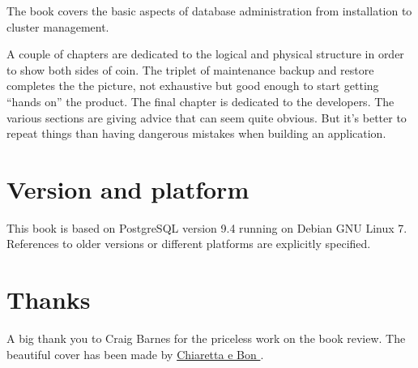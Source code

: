 \documentclass[oneside]{book}
\begin{document}
The book covers the basic aspects of database administration from installation
to cluster management.\newline

A couple of chapters are dedicated to the logical and physical structure in
order to show both sides of coin.  The triplet of maintenance backup and restore completes the 
the picture, not exhaustive but good enough to start getting ``hands on'' the product.
The final chapter is dedicated to the developers. The various sections are 
giving advice that can seem quite obvious. But it's better to repeat things than having dangerous 
mistakes when building an application. 

\chapter*{Version and platform}
This book is based on PostgreSQL version 9.4 running on Debian GNU Linux 7.
References to older versions or different platforms are explicitly specified.


\chapter*{Thanks}
A big thank you to Craig Barnes for the priceless work on the book review.\newline
The beautiful cover has been made by \href{http://www.bonland.eu/}{
Chiaretta e Bon }.\newline

\tableofcontents{}













\appendix


\listoffigures
\listoftables
\printindex{}
\end{document}
